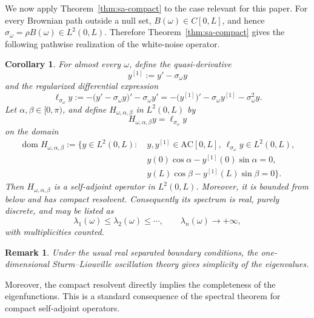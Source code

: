 \documentclass[11pt]{article}
\newtheorem{corollary}[theorem]{Corollary}
\newtheorem{remark}[theorem]{Remark}
\begin{document}
We now apply Theorem~\ref{thm:sa-compact} to the case relevant for this paper. For every Brownian path outside a null set, $B(\omega)\in C[0,L]$, and hence $\sigma_\omega=\rho B(\omega)\in L^2(0,L)$. Therefore Theorem~\ref{thm:sa-compact} gives the following pathwise realization of the white-noise operator.
\begin{corollary}
For almost every $\omega$, define the quasi-derivative
\begin{equation*}
    y^{[1]}:=y'-\sigma_\omega y
\end{equation*}
and the regularized differential expression
\begin{equation*}
    \ell_{\sigma_\omega}y
    :=-\bigl(y'-\sigma_\omega y\bigr)'-\sigma_\omega y'
    =-\bigl(y^{[1]}\bigr)'-\sigma_\omega y^{[1]}-\sigma_\omega^2y .
\end{equation*}
Let $\alpha,\beta\in[0,\pi)$, and define $H_{\omega,\alpha,\beta}$ in $L^2(0,L)$ by
\begin{equation*}
    H_{\omega,\alpha,\beta}y=\ell_{\sigma_\omega}y
\end{equation*}
on the domain
\begin{align*}
\operatorname{dom} H_{\omega,\alpha,\beta}:=\bigl\{y\in L^2(0,L):&\ y,y^{[1]}\in \mathrm{AC}[0,L],\ \ell_{\sigma_\omega}y\in L^2(0,L),\nonumber\\
&\ y(0)\cos\alpha-y^{[1]}(0)\sin\alpha=0,\nonumber\\
&\ y(L)\cos\beta-y^{[1]}(L)\sin\beta=0\bigr\}.
\end{align*}
Then $H_{\omega,\alpha,\beta}$ is a self-adjoint operator in $L^2(0,L)$. Moreover, it is bounded from below and has compact resolvent. Consequently its spectrum is real, purely discrete, and may be listed as
\begin{equation*}
    \lambda_1(\omega)\le \lambda_2(\omega)\le\cdots,
    \qquad \lambda_n(\omega)\to +\infty,
\end{equation*}
with multiplicities counted. 
\end{corollary}
\begin{remark}
	Under the usual real separated boundary conditions, the one-dimensional Sturm--Liouville oscillation theory gives simplicity of the eigenvalues.
\end{remark}

Moreover, the compact resolvent directly implies the completeness of the eigenfunctions. This is a standard consequence of the spectral theorem for compact self-adjoint operators.
\end{document}
